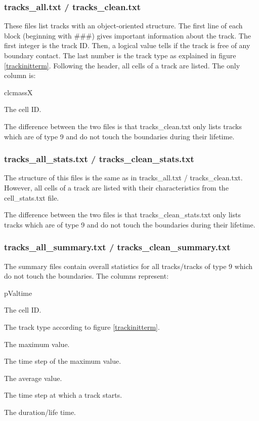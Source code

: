 \documentclass{scrartcl}
\begin{document}
\subsubsection{tracks\_all.txt / tracks\_clean.txt}
These files list tracks with an object-oriented structure. The first line of each block (beginning with \#\#\#) gives important information about the track. The first integer is the track ID. Then, a logical value tells if the track is free of any boundary contact. The last number is the track type as explained in figure \ref{trackinitterm}. Following the header, all cells of a track are listed. The only column is:
\begin{labeling}{clcmassX}
	\item[clID] The cell ID.
\end{labeling}
The difference between the two files is that tracks\_clean.txt only lists tracks which are of type 9 and do not touch the boundaries during their lifetime. 

\subsubsection{tracks\_all\_stats.txt / tracks\_clean\_stats.txt}
The structure of this files is the same as in tracks\_all.txt / tracks\_clean.txt. However, all cells of a track are listed with their characteristics from the cell\_stats.txt file.

The difference between the two files is that tracks\_clean\_stats.txt only lists tracks which are of type 9 and do not touch the boundaries during their lifetime.

\subsubsection{tracks\_all\_summary.txt / tracks\_clean\_summary.txt}
The summary files contain overall statistics for all tracks/tracks of type 9 which do not touch the boundaries. The columns represent:
\begin{labeling}{pValtime}
	\item[trackID] The cell ID.
	\item[trType] The track type according to figure \ref{trackinitterm}.
	\item[peakVal] The maximum value.
	\item[pValtime] The time step of the maximum value.
	\item[avVal] The average value.	
	\item[start] The time step at which a track starts.
	\item[dur] The duration/life time.
\end{labeling}
\end{document}
